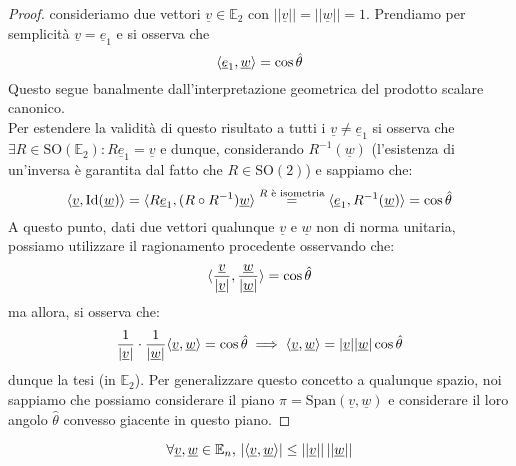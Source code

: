 \begin{proof}
consideriamo due vettori $\underline{v} \in \mathbb{E}_2$ con $|| \underline{v} || = || \underline{w} || = 1$. Prendiamo per semplicità $\underline{v} = \underline{e}_1$ e si osserva che
$$
\langle \underline{e}_1, \underline{w} \rangle = \cos{\hat{\theta}}
$$
Questo segue banalmente dall'interpretazione geometrica del prodotto scalare canonico. \\
Per estendere la validità di questo risultato a tutti i $\underline{v} \neq \underline{e}_1$ si osserva che $\exists R \in \text{SO}(\mathbb{E}_2): R\underline{e}_1 = \underline{v}$ e dunque, considerando $R^{-1}(\underline{w})$ (l'esistenza di un'inversa è garantita dal fatto che $R \in \text{SO}(2)$) e sappiamo che:
$$
\langle \underline{v}, \text{Id}(\underline{w}) \rangle = \langle R \underline{e}_1, (R \circ R^{-1})\underline{w} \rangle \stackrel{R\text{ è isometria}}{=} \langle \underline{e}_1, R^{-1}(\underline{w}) \rangle =  \cos{\hat{\theta}}
$$
A questo punto, dati due vettori qualunque $\underline{v}$ e $\underline{w}$ non di norma unitaria, possiamo utilizzare il ragionamento procedente osservando che:
$$
\langle \frac{\underline{v}}{|\underline{v}|}, \frac{\underline{w}}{|\underline{w}|} \rangle = \cos{\hat{\theta}}
$$
ma allora, si osserva che:
$$
\frac{1}{|\underline{v}|} \cdot \frac{1}{|\underline{w}|} \langle \underline{v}, \underline{w} \rangle = \cos{\hat{\theta}} \implies \langle \underline{v},  \underline{w} \rangle = |\underline{v}| |\underline{w}| \cos{\hat{\theta}}
$$
dunque la tesi (in $\mathbb{E}_2$). Per generalizzare questo concetto a qualunque spazio, noi sappiamo che possiamo considerare il piano $\pi = \text{Span}(\underline{v}, \underline{w})$ e considerare il loro angolo $\hat{\theta}$ convesso giacente in questo piano.
\end{proof}
\begin{prop}
$$\forall \underline{v}, \underline{w} \in \mathbb{E}_n, \, | \langle \underline{v}, \underline{w} \rangle | \leq ||\underline{v}|| \, ||\underline{w}||$$
\label{prop:dis_cs}
\end{prop}
